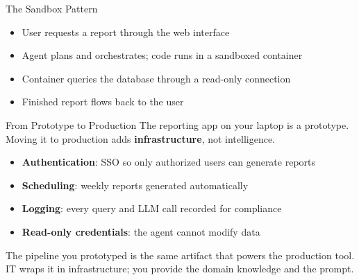 \documentclass[aspectratio=169]{beamer}
\begin{document}
\begin{frame}{The Sandbox Pattern}
\begin{center}
\end{center}
\vspace{0.2cm}
\begin{itemize}
  \item User requests a report through the web interface
  \item Agent plans and orchestrates; code runs in a sandboxed container
  \item Container queries the database through a \alert{read-only} connection
  \item Finished report flows back to the user
\end{itemize}
\end{frame}

\begin{frame}{From Prototype to Production}
The reporting app on your laptop is a prototype.  Moving it to production adds \textbf{infrastructure}, not intelligence.
\vspace{0.3cm}
\begin{itemize}
  \item \textbf{Authentication}: SSO so only authorized users can generate reports
  \item \textbf{Scheduling}: weekly reports generated automatically
  \item \textbf{Logging}: every query and LLM call recorded for compliance
  \item \textbf{Read-only credentials}: the agent cannot modify data
\end{itemize}
\vspace{0.3cm}
The pipeline you prototyped is the same artifact that powers the production tool.  IT wraps it in infrastructure; \alert{you provide the domain knowledge and the prompt}.
\end{frame}
\end{document}
